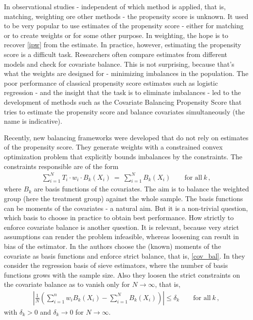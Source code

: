 In observational studies - independent of which method is applied, that is, matching, weighting ore other methods -
the propensity score is unknown.
It used to be very popular to use estimates of the propensity score - either for matching or to create weights or for some other purpose.
In weighting, the hope is to recover \eqref{ipw} from the estimate.
In practice, however, estimating the propensity score is a difficult task.
Researchers often compare estimates from different models and check for covariate balance. 
This is not surprising, because that's what the weights are designed for - minimizing imbalances in the population.
The poor performance of classical propensity score estimates such as logistic regression - and the insight that the task is to eliminate imbalances -
led to the development of methods such as the Covariate Balancing Propensity Score \cite{Imai2014a} that tries to 
estimate the propensity score and balance covariates simultaneously (the name is indicative).

Recently, new balancing frameworks were developed that do not rely on estimates of the propensity score\cite{Hainmueller2012,Zubizarreta2015}.
They generate weights with a constrained convex optimization problem that explicitly bounds imbalances by the constraints. 
The constraints responsible are of the form
\begin{gather}
  \label{cov_bal}
    \sum_{i=1}^{N}
    T_i
    \cdot
    w_i
    \cdot
    B_k(X_i)
    \ 
  =
    \ 
    \sum_{i=1}^{N} 
    B_k(X_i)
  \qquad
  \text{for all}\ 
  k\,,
\end{gather}
where $B_k$ are basis functions of the covariates.
The aim is to balance the weighted group (here the treatment group) against the whole sample.
The basis functions can be moments of the covariates - a natural aim. 
But it is a non-trivial question, which basis to choose in practice to obtain best performance.
How strictly to enforce covariate balance is another question.
It is relevant, because very strict assumptions can render the problem infeasible, whereas loosening can result in bias of the estimator.
In \cite{Hainmueller2012} the authors choose the (known) moments of the covariate as basis functions and enforce strict balance, that is, \eqref{cov_bal}.
In \cite{Wang2019} they consider the regression basis of sieve estimators\cite{Newey1997a}, where the number of basis functions grows with the sample size.
Also they loosen the strict constraints on the covariate balance as to vanish only for $N\to\infty$, that is,
\begin{gather*}
  \left| 
  \frac{1}{N}
  \left( 
    \sum_{i=1}^{n}
    w_i
    B_k(X_i)
    -
    \sum_{i=1}^{N} 
    B_k(X_i)
  \right)
  \right|
  \le
  \delta_k
  \qquad
  \text{for all}\ 
  k\,,
\end{gather*}
with $\delta_k > 0 $ and $\delta_k\to 0$ for $N\to\infty$.

